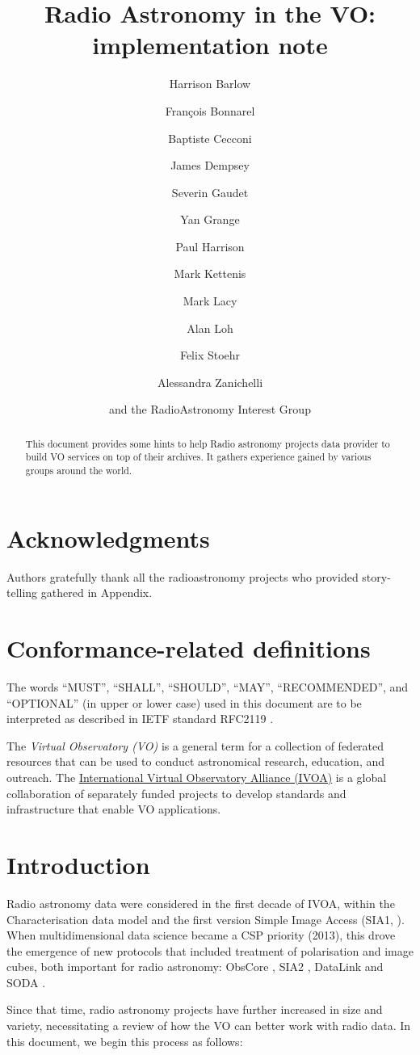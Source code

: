 \documentclass[11pt,a4paper]{ivoatex/ivoa}
\title{Radio Astronomy in the VO:\\ implementation note}
\author[https://wiki.ivoa.net/twiki/bin/view/IVOA/HarrisonBarlow]{Harrison Barlow}
\author[https://wiki.ivoa.net/twiki/bin/view/IVOA/FrancoisBonnarel]{Fran\c cois Bonnarel}
\author[https://wiki.ivoa.net/twiki/bin/view/IVOA/BaptisteCecconi]{Baptiste Cecconi}
\author[https://wiki.ivoa.net/twiki/bin/view/IVOA/JamesDempsey]{James Dempsey}
\author[https://wiki.ivoa.net/twiki/bin/view/IVOA/SeverinGaudet]{Severin Gaudet}
\author[https://wiki.ivoa.net/twiki/bin/view/IVOA/YanGrange]{Yan Grange}
\author[https://wiki.ivoa.net/twiki/bin/view/IVOA/PaulHarrison]{Paul Harrison}
\author[https://wiki.ivoa.net/twiki/bin/view/IVOA/MarkKettenis]{Mark Kettenis
}
\author[https://wiki.ivoa.net/twiki/bin/view/IVOA/MarkLacy]{Mark Lacy}
\author[https://wiki.ivoa.net/twiki/bin/view/IVOA/AlanLoh]{Alan Loh}
\author[https://wiki.ivoa.net/twiki/bin/view/IVOA/FelixStoehr]{Felix Stoehr}
\author[https://wiki.ivoa.net/twiki/bin/view/IVOA/AlessandraZanichelli]{Alessandra Zanichelli}
\author{and the RadioAstronomy Interest Group}
\begin{document}
\begin{abstract}
	This document provides some hints to help Radio astronomy projects data provider to build VO
	services on top of their archives. It gathers experience gained by various groups around the world.
\end{abstract}


\section*{Acknowledgments}

Authors gratefully thank all the radioastronomy projects who provided story-telling gathered in 
Appendix.

\section*{Conformance-related definitions}

The words ``MUST'', ``SHALL'', ``SHOULD'', ``MAY'', ``RECOMMENDED'', and
``OPTIONAL'' (in upper or lower case) used in this document are to be
interpreted as described in IETF standard RFC2119 \citep{std:RFC2119}.

The \emph{Virtual Observatory (VO)} is a
general term for a collection of federated resources that can be used
to conduct astronomical research, education, and outreach.
The \href{https://www.ivoa.net}{International
Virtual Observatory Alliance (IVOA)} is a global
collaboration of separately funded projects to develop standards and
infrastructure that enable VO applications.


\section{Introduction}

Radio astronomy data were considered in the first decade of IVOA, within the Characterisation data 
model \citep{2008ivoa.spec.0325L} and the first version Simple Image Access (SIA1, \cite{std:SIAP}). 
When multidimensional data science became a CSP priority (2013), this drove the emergence of new 
protocols that included treatment of polarisation and image cubes, both important for radio 
astronomy: ObsCore \citep{std:OBSCORE}, SIA2 \citep{std:SIAV2} , DataLink \citep{2015ivoa.spec.0617D} 
and SODA \citep{std:SODA}. 

Since that time, radio astronomy projects have further increased in size and variety, necessitating 
a review of how the VO can better work with radio data. In this document, we begin this process as 
follows:
\end{document}
